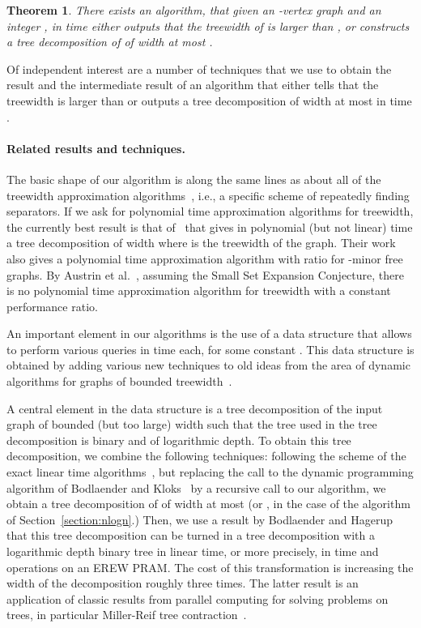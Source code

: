 \documentclass[a4paper,11pt]{article}
\newtheorem{theorem}{Theorem}
\theoremstyle{definition}
\theoremstyle{remark}
\begin{document}
\begin{theorem}\label{thm:mainThm}
  There exists an algorithm, that given an -vertex graph  and
  an integer , in time  either outputs that the treewidth
  of  is larger than , or constructs a tree decomposition of 
  of width at most .
\end{theorem}

Of independent interest are a number of techniques that we use to
obtain the result and the intermediate result of an algorithm that
either tells that the treewidth is larger than  or outputs a tree
decomposition of width at most  in time .



\paragraph{Related results and techniques.}
The basic shape of our algorithm is along the same lines as about all
of the treewidth approximation algorithms~\cite{Amir10,
  BodlaenderGHK95, FeigeHL08, Lagergren96, Reed92, RobertsonS13},
i.e., a specific scheme of repeatedly finding separators.  If we ask
for polynomial time approximation algorithms for treewidth, the
currently best result is that of~\cite{FeigeHL08} that gives in
polynomial (but not linear) time a tree decomposition of width  where  is the treewidth of the graph.  Their
work also gives a polynomial time approximation algorithm with ratio
 for -minor free graphs.
By Austrin et al.~\cite{AustrinPW12}, assuming the Small Set Expansion
Conjecture, there is no polynomial time approximation algorithm for
treewidth with a constant performance ratio.

An important element in our algorithms is the use of a data structure
that allows to perform various queries in time  each,
for some constant .  This data structure is obtained by adding
various new techniques to old ideas from the area of dynamic
algorithms for graphs of bounded treewidth~\cite{Bodlaender92b,
  CohenSTV93, ChaudhuriZ98, ChaudhuriZ00, Hagerup00}.

A central element in the data structure is a tree decomposition of the
input graph of bounded (but too large) width such that the tree used
in the tree decomposition is binary and of logarithmic depth.  To
obtain this tree decomposition, we combine the following techniques:
following the scheme of the exact linear time
algorithms~\cite{Bodlaender96, PerkovicR00}, but replacing the call to
the dynamic programming algorithm of Bodlaender and
Kloks~\cite{BodlaenderK96} by a recursive call to our algorithm, we
obtain a tree decomposition of  of width at most  (or
, in the case of the  algorithm of
Section~\ref{section:nlogn}.)  Then, we use a result by Bodlaender and
Hagerup~\cite{BodlaenderH98} that this tree decomposition can be
turned in a tree decomposition with a logarithmic depth binary tree in
linear time, or more precisely, in  time and  operations on an EREW PRAM.
The cost of this transformation is increasing the width of the decomposition roughly three times.
The latter result is an application of classic results from parallel computing for solving problems on trees,
in particular Miller-Reif tree contraction~\cite{MillerR89,MillerR91}.
\end{document}
